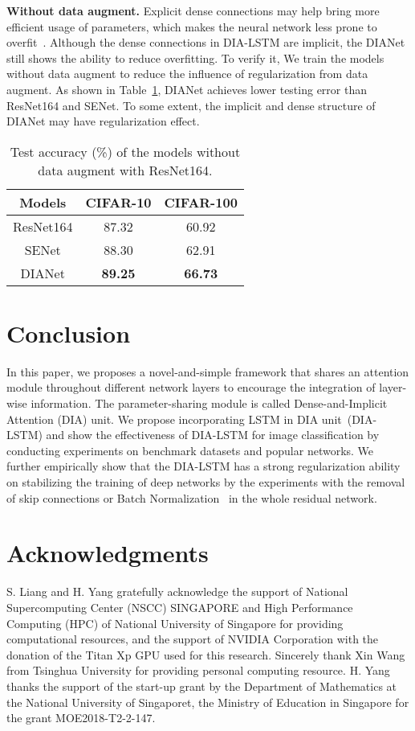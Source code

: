 \documentclass[letterpaper]{article} \usepackage{aaai20}  \usepackage{times}  \usepackage{helvet} \usepackage{courier}  \usepackage[hyphens]{url}  \usepackage{graphicx} \urlstyle{rm} \def\UrlFont{\rm}  \usepackage{graphicx}  \frenchspacing  \setlength{\pdfpagewidth}{8.5in}  \setlength{\pdfpageheight}{11in}  \usepackage{color}
\begin{document}
	\noindent\textbf{Without data augment.} Explicit dense connections may help bring more efficient usage of parameters, which makes the neural network less prone to overfit~\cite{huang2017densely}. Although the dense connections in DIA-LSTM are implicit, the DIANet still shows the ability to reduce overfitting. To verify it, We train the models without data augment to reduce the influence of regularization from data augment. As shown in Table~\ref{tab:remove stage and without aug}, DIANet achieves lower testing error than ResNet164 and SENet. To some extent, the implicit and dense structure of DIANet may have regularization effect. 
	\begin{table}
			\small
			\centering
			\begin{tabular}{|c|c|c|}
				\toprule
				Models    & CIFAR-10  & CIFAR-100 \\
				\midrule
				ResNet164 & 87.32 &60.92 \\
				SENet & 88.30     & 62.91 \\
				DIANet & \textbf{89.25}     & \textbf{66.73} \\
				\bottomrule
			\end{tabular}\caption{Test accuracy (\%) of the models without data augment with ResNet164.}
		\label{tab:remove stage and without aug}\end{table}{}	
	\section{Conclusion}
	\label{conculsion}
	In this paper, we proposes a novel-and-simple framework that shares an attention module throughout different network layers to encourage the integration of layer-wise information. The parameter-sharing module is called Dense-and-Implicit Attention (DIA) unit. 
	We propose incorporating LSTM in DIA unit~(DIA-LSTM) and show the effectiveness of DIA-LSTM for image classification by conducting experiments on benchmark datasets and popular networks.
	We further empirically show that the DIA-LSTM has a strong regularization ability on stabilizing the training of deep networks by the experiments with the removal of skip connections or Batch Normalization~\cite{Ioffe:2015:BNA:3045118.3045167} in the whole residual network.
	\small
 	\section{Acknowledgments}
	
 	S. Liang and H. Yang gratefully acknowledge the support of National Supercomputing Center (NSCC) SINGAPORE and High Performance Computing (HPC) of National University of Singapore for providing computational resources, and the support of NVIDIA Corporation with the donation of the Titan Xp GPU used for this research. Sincerely thank Xin Wang from Tsinghua University for providing personal computing resource. H. Yang thanks the support of the start-up grant by the Department of Mathematics at the National University of Singaporet, the Ministry of Education in Singapore for the grant MOE2018-T2-2-147.
 	
\end{document}
